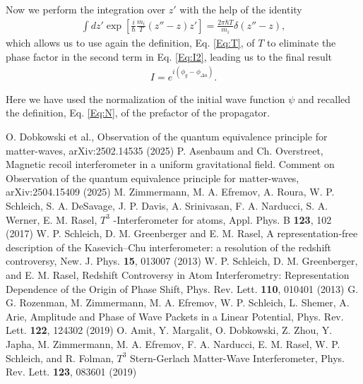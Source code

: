 \documentclass[aps,prx,onecolumn,superscriptaddress,longbibliography]{revtex4-2}
\begin{document}
\begin{appendix}
Now we perform the integration over $z'$ with the help of the identity
\begin{align}
    \int dz' \exp \left[\frac{i}{\hbar} \frac{m_i}{T} (z''-z)z' \right]=\frac{2\pi\hbar T}{m_i}\delta(z''-z),
\end{align}
which allows us to use again the definition, Eq. \eqref{Eq:T}, of $T$ to eliminate the phase factor in the second term in Eq. \eqref{Eq:I2}, leading us to the final result
\begin{align}
    I=e^{i \left(\phi_g -\phi_{\Delta a}\right)}.
\end{align}

Here we have used the normalization of the initial wave function $\psi$ and recalled the definition, Eq. \eqref{Eq:N}, of the prefactor of the propagator.

\end{appendix}

\begin{thebibliography}{}
 O. Dobkowski et al., Observation of the quantum equivalence principle for matter-waves, arXiv:2502.14535 (2025)
  P. Asenbaum and Ch. Overstreet, Magnetic recoil interferometer in a uniform gravitational field. Comment on Observation of the quantum equivalence principle for matter-waves, arXiv:2504.15409 (2025)
 M. Zimmermann, M. A. Efremov, A. Roura, W. P. Schleich, S. A. DeSavage, J. P. Davis, A. Srinivasan, F. A. Narducci, S. A. Werner, E. M. Rasel, $T^3$ -Interferometer for atoms, Appl. Phys. B {\bf 123}, 102 (2017)
 W. P. Schleich, D. M. Greenberger and E. M. Rasel, A representation-free description of the Kasevich–Chu interferometer: a resolution of the redshift controversy, New. J. Phys. {\bf 15}, 013007 (2013)
 W. P. Schleich, D. M. Greenberger, and E. M. Rasel, Redshift Controversy in Atom Interferometry: Representation Dependence of the Origin of Phase Shift, Phys. Rev. Lett. {\bf 110}, 010401 (2013)
 G. G. Rozenman, M. Zimmermann, M. A. Efremov, W. P. Schleich, L. Shemer, A. Arie, Amplitude and Phase of Wave Packets in a Linear Potential, Phys. Rev. Lett. {\bf 122}, 124302 (2019)
 O. Amit, Y. Margalit, O. Dobkowski, Z. Zhou, Y. Japha, M. Zimmermann, M. A. Efremov, F. A. Narducci, E. M. Rasel, W. P. Schleich, and R. Folman, $T^3$ Stern-Gerlach Matter-Wave Interferometer, Phys. Rev. Lett.
{\bf 123}, 083601 (2019)
\end{thebibliography}
\end{document}
